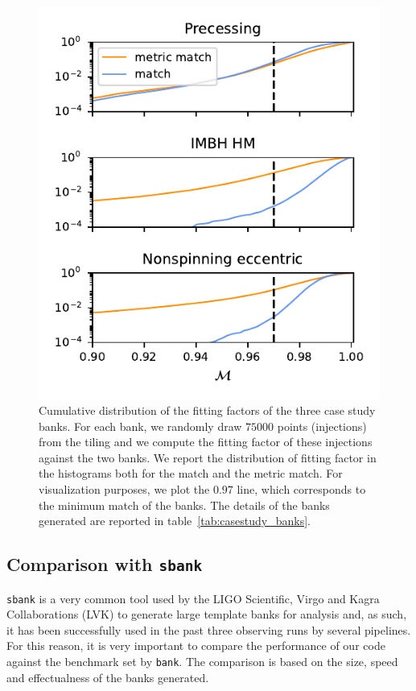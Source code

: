 \documentclass[twocolumn,showpacs,preprintnumbers,nofootinbib,prd,
superscriptaddress,10pt]{revtex4-2}
\newcommand{\stefano}[1]{{\textcolor{blue}{\texttt{SS: #1}} }}
\begin{document}
\begin{figure}[t!]
	\includegraphics{bank_injections}
	\caption{
	Cumulative distribution of the fitting factors of the three case study banks. For each bank, we randomly draw $75000$ points (injections) from the tiling and we compute the fitting factor of these injections against the two banks. We report the distribution of fitting factor in the histograms both for the match and the metric match. For visualization purposes, we plot the $0.97$ line, which corresponds to the minimum match of the banks.
	The details of the banks generated are reported in table~\ref{tab:casestudy_banks}.
	}
	\label{fig:bank_injections}
\end{figure}

\subsection{Comparison with \texttt{sbank} }\label{sec:sbank_comparison}

\texttt{sbank} \cite{sbank} is a very common tool used by the LIGO Scientific, Virgo and Kagra Collaborations (LVK) to generate large template banks for analysis and, as such, it has been successfully used in the past three observing runs by several pipelines.
For this reason, it is very important to compare the performance of our code against the benchmark set by \texttt{bank}. The comparison is based on the size, speed and effectualness of the banks generated.
\end{document}
